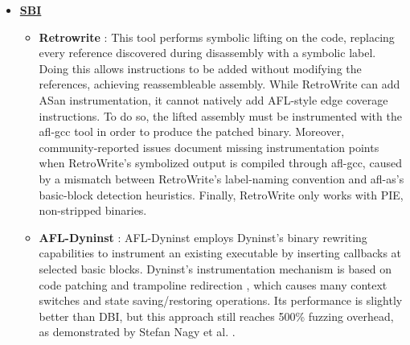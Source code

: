 \begin{itemize}
\begin{itemize}
                \item \textbf{DynamoRIO/Pin} \cite{DynamoRIOPaper,PinPaper}: Both these approaches share the same basic principle, called
                \textbf{\gls{JIT} code caching}. This consists in taking control of the thread when the target application starts,
                and from that moment on, every \gls{BB} is intercepted before it is executed and is copied into a private \textbf{Code Cache}.
                The instrumentation is then added to the copy, and control is transferred to the code cache.
                The instrumentation process is more or less identical to FRIDA's Stalker mechanism, but is not as optimized.
                Also in this case, the implemented version uses AFL \cite{zalewski2017afl} as the fuzzer \cite{heuse2018afldynamorio,heuse2018aflpin}.
        \end{itemize}
            \item \underline{\textbf{\gls{SBI}}}
            \begin{itemize}
                \item \textbf{Retrowrite} \cite{retrowrite}: This tool performs symbolic lifting on the code, replacing every reference
                    discovered during disassembly with a symbolic label. Doing this allows instructions to be added without
                    modifying the references, achieving reassembleable assembly.
                    While RetroWrite can add ASan instrumentation, it cannot natively add AFL-style edge coverage instructions.
                    To do so, the lifted assembly must be instrumented with the afl-gcc tool in order to produce the patched binary.
                    Moreover, community-reported issues \cite{retrowrite_issue28} document missing instrumentation points when
                    RetroWrite's symbolized output is compiled through afl-gcc, caused by a mismatch between RetroWrite's
                    label-naming convention and afl-as's basic-block detection heuristics.
                    Finally, RetroWrite only works with PIE, non-stripped binaries.
                \item \textbf{AFL-Dyninst} \cite{afldyninst}: AFL-Dyninst employs Dyninst's binary rewriting capabilities
                        to instrument an existing executable by inserting callbacks at selected basic blocks.
                        Dyninst's instrumentation mechanism is based on code patching and trampoline redirection \cite{Dyninst},
                        which causes many context switches and state saving/restoring operations.
                        Its performance is slightly better than \gls{DBI}, but this approach still reaches 500\% fuzzing overhead,
                        as demonstrated by Stefan Nagy et al. \cite{zafl}.
                

\end{itemize}
\end{itemize}

